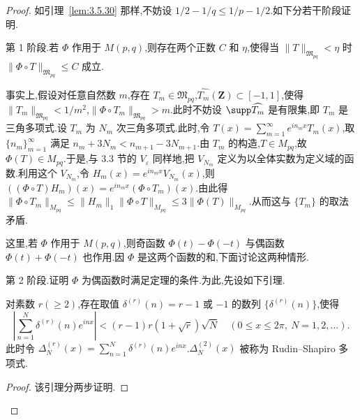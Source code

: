 \begin{proof}
如引理~\ref{lem:3.5.30} 那样,不妨设 $1/2 - 1/q \leq 1/p - 1/2$.如下分若干阶段证明.

第 1 阶段.若 $\Phi$ 作用于 $M(p,q)$,则存在两个正数 $C$ 和 $\eta$,使得当 $\|T\|_{\mathfrak{M}_{pq}} < \eta$ 时 $\|\Phi \circ T\|_{\mathfrak{M}_{pq}} \leq C$ 成立.

事实上,假设对任意自然数 $m$,存在 $T_{m} \in \mathfrak{M}_{pq}$,$\widehat{T_{m}}(\mathbf{Z}) \subset [-1, 1]$,使得 $\|T_{m}\|_{\mathfrak{M}_{pq}} < 1/m^{2}$,$\|\Phi \circ T_{m}\|_{\mathfrak{M}_{pq}} > m$.此时不妨设 $\supp\widehat{T_{m}}$ 是有限集,即 $T_{m}$ 是三角多项式.设 $T_{m}$ 为 $N_{m}$ 次三角多项式.此时,令 $T(x) = \sum_{m=1}^{\infty}e^{in_{m}x}T_{m}(x)$,取 $\{n_{m}\}_{m=1}^{\infty}$ 满足 $n_{m} + 3N_{m} < n_{m+1} - 3N_{m+1}$.由 $T_{m}$ 的构造,$T \in M_{pq}$,故 $\Phi(T) \in M_{pq}$.于是,与 3.3 节的 $V_{\varepsilon}$ 同样地,把 $V_{N_{m}}$ 定义为以全体实数为定义域的函数.利用这个 $V_{N_{m}}$,令 $H_{m}(x) = e^{in_{m}x}V_{N_{m}}(x)$,则 $((\Phi \circ T)H_{m})(x) = e^{in_{m}x}(\Phi \circ T_{m})(x)$.由此得 $\|\Phi \circ T_{m}\|_{M_{pq}} \leq \|H_{m}\|_{1}\|\Phi \circ T\|_{M_{pq}} \leq 3\|\Phi(T)\|_{M_{pq}}$.从而这与 $\{T_{m}\}$ 的取法矛盾.

这里,若 $\Phi$ 作用于 $M(p,q)$,则奇函数 $\Phi(t)-\Phi(-t)$ 与偶函数 $\Phi(t)+\Phi(-t)$ 也作用.因 $\Phi$ 是这两个函数的和,下面讨论这两种情形.

第 2 阶段.证明 $\Phi$ 为偶函数时满足定理的条件.为此,先设如下引理.

\begin{lemma}\label{lem:3.5.32}
对素数 $r(\geq 2)$,存在取值 $\delta^{(r)}(n)=r-1$ 或 $-1$ 的数列 $\{\delta^{(r)}(n)\}$,使得
\begin{equation*}
\left|\sum_{n=1}^{N}\delta^{(r)}(n)e^{inx}\right| < (r-1)r(1+\sqrt{r})\sqrt{N} \quad (0 \leq x \leq 2\pi,\ N = 1, 2, \ldots).
\end{equation*}
此时令 $\Delta_{N}^{(r)}(x)=\sum_{n=1}^{N}\delta^{(r)}(n)e^{inx}$.$\Delta_{N}^{(2)}(x)$ 被称为 Rudin--Shapiro 多项式.
\end{lemma}

\begin{proof}
该引理分两步证明.


\end{proof}
\end{proof}
